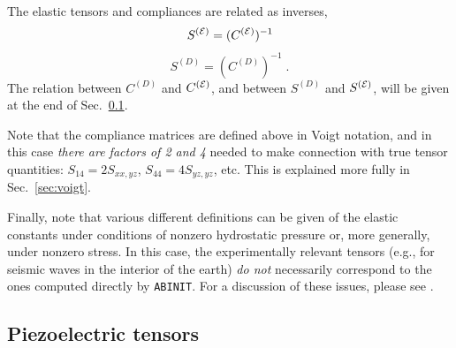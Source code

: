 \documentclass[11pt,fleqn]{article}
\def\beq{\begin{equation}}
\def\eeq{\end{equation}}
\def\E{{\cal E}}
\def\eps{\epsilon}
\def\ABINIT{{{\tt ABINIT}}}
\begin{document}
The elastic tensors and compliances are related as inverses,
%
\beq
S^{(\E)}=(C^{(\E)})^{-1}
\eeq
%
%
\beq
S^{(D)}=(C^{(D)})^{-1} \;.
\eeq
%
The relation between $C^{(D)}$ and $C^{(\E)}$,
and between $S^{(D)}$ and $S^{(\E)}$, will be given
at the end of Sec.~\ref{sec:piezo-tens}.

Note that the compliance matrices are defined above in Voigt
notation, and in this case {\it there are factors of 2 and 4}
needed to make connection with true tensor quantities:
$S_{14}=2S_{xx,yz}$, $S_{44}=4S_{yz,yz}$, etc.  This is explained
more fully in Sec.~\ref{sec:voigt}.

Finally, note that various different definitions can be given of
the elastic constants under conditions of nonzero hydrostatic
pressure or, more generally, under nonzero stress.  In this case,
the experimentally relevant tensors (e.g., for seismic waves in
the interior of the earth) {\it do not} necessarily correspond to the ones
computed directly by \ABINIT.  For a discussion of these issues,
please see \cite{oganov}.

% 
% 
% 
% 
% 

\subsection{Piezoelectric tensors}
\label{sec:piezo-tens}
\end{document}
